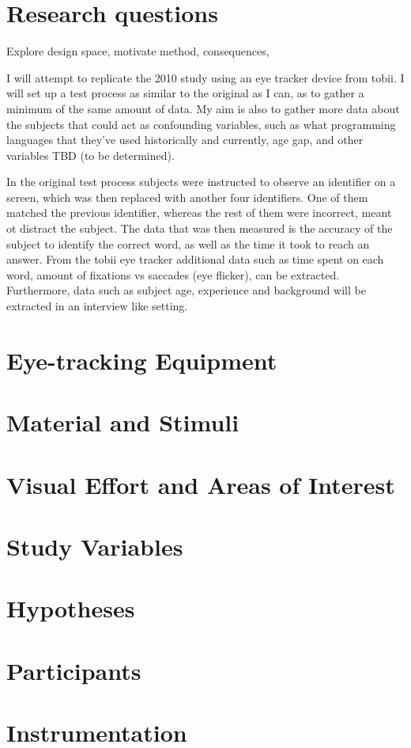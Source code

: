 \iffalse
\begin{itemize}
	\item How to measure simplicity and scalability
	\item Not just what you did but why and what the consequences are
\end{itemize}
\fi

\section{Research questions}
Explore design space, motivate method, consequences, 


I will attempt to replicate the 2010 study using an eye tracker device from tobii. I will set up a test process as similar to the original as I can, as to gather a minimum of the same amount of data. My aim is also to gather more data about the subjects that could act as confounding variables, such as what programming languages that they've used historically and currently, age gap, and other variables TBD (to be determined).

In the original test process subjects were instructed to observe an identifier on a screen, which was then replaced with another four identifiers. One of them matched the previous identifier, whereas the rest of them were incorrect, meant ot distract the subject. The data that was then measured is the accuracy of the subject to identify the correct word, as well as the time it took to reach an answer. From the tobii eye tracker additional data such as time spent on each word, amount of fixations vs saccades (eye flicker), can be extracted.
Furthermore, data such as subject age, experience and background will be extracted in an interview like setting.

\section{Eye-tracking Equipment}

\section{Material and Stimuli}

\section{Visual Effort and Areas of Interest}

\section{Study Variables}

\section{Hypotheses}

\section{Participants}

\section{Instrumentation}